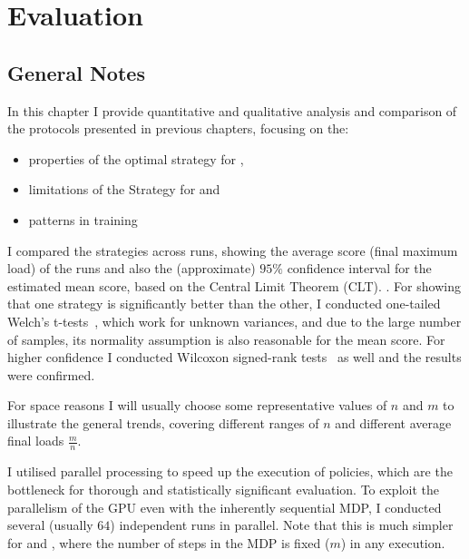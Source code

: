 \chapter{Evaluation}\label{evaluation}


\ifpdf
    \graphicspath{{Chapter3/Figs/Raster/}{Chapter3/Figs/PDF/}{Chapter3/Figs/}}
\else
    \graphicspath{{Chapter3/Figs/Vector/}{Chapter3/Figs/}}
\fi


\section{General Notes} \label{evaluationnotes}

In this chapter I provide quantitative and qualitative analysis and comparison of the protocols presented in previous chapters, focusing on the:

\begin{itemize}
    \item properties of the optimal \DP strategy for \TwoThinning,
    \item limitations of the \Greedy Strategy for \GraphicalTwoChoice and
    \item patterns in \DQL training
\end{itemize} 


I compared the strategies across \NumberofRuns runs, showing the average score (final maximum load) of the runs and also the (approximate) $95\%$ confidence interval for the estimated mean score, based on the Central Limit Theorem (CLT). . For showing that one strategy is significantly better than the other, I conducted one-tailed Welch's t-tests~\cite{welch1947ttest}, which work for unknown variances, and due to the large number of samples, its normality assumption is also reasonable for the mean score. For higher confidence I conducted Wilcoxon signed-rank tests~\cite{wilcoxon1992test} as well and the results were confirmed.


For space reasons I will usually choose some representative values of $n$ and $m$ to illustrate the general trends, covering different ranges of $n$ and different average final loads $\frac{m}{n}$.


I utilised parallel processing to speed up the execution of \DQL policies, which are the bottleneck for thorough and statistically significant evaluation. To exploit the parallelism of the GPU even with the inherently sequential MDP, I conducted several (usually $64$) independent runs in parallel. Note that this is much simpler for \TwoThinning and \GraphicalTwoChoice, where the number of steps in the MDP is fixed ($m$) in any execution.


